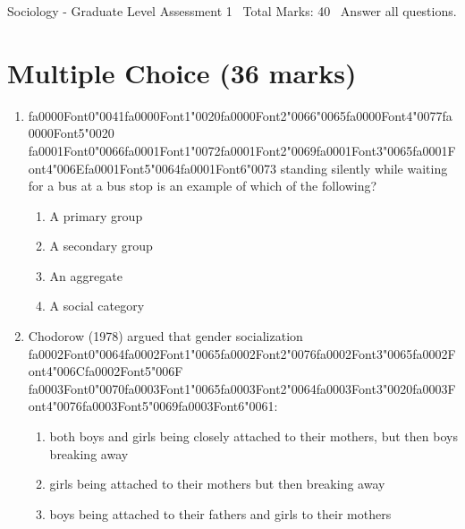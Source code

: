 \documentclass[12pt]{article}
\begin{document}
\begin{center}
Sociology - Graduate Level Assessment 1 \
Total Marks: 40 \
Answer all questions.
\end{center}

\section*{Multiple Choice (36 marks)}
\begin{enumerate}[label=\arabic*.]
\item {\csname fa0000Font0\endcsname\char"0041}{\csname fa0000Font1\endcsname\char"0020}{\csname fa0000Font2\endcsname\char"0066}{\char"0065}{\csname fa0000Font4\endcsname\char"0077}{\csname fa0000Font5\endcsname\char"0020} {\csname fa0001Font0\endcsname\char"0066}{\csname fa0001Font1\endcsname\char"0072}{\csname fa0001Font2\endcsname\char"0069}{\csname fa0001Font3\endcsname\char"0065}{\csname fa0001Font4\endcsname\char"006E}{\csname fa0001Font5\endcsname\char"0064}{\csname fa0001Font6\endcsname\char"0073} standing silently while waiting for a bus at a bus stop is an example of which of the following?
\begin{enumerate}[label=(\alph*)]
    \item A primary group
    \item A secondary group
    \item An aggregate
    \item A social category
\end{enumerate}
\item Chodorow (1978) argued that gender socialization {\csname fa0002Font0\endcsname\char"0064}{\csname fa0002Font1\endcsname\char"0065}{\csname fa0002Font2\endcsname\char"0076}{\csname fa0002Font3\endcsname\char"0065}{\csname fa0002Font4\endcsname\char"006C}{\csname fa0002Font5\endcsname\char"006F} {\csname fa0003Font0\endcsname\char"0070}{\csname fa0003Font1\endcsname\char"0065}{\csname fa0003Font2\endcsname\char"0064}{\csname fa0003Font3\endcsname\char"0020}{\csname fa0003Font4\endcsname\char"0076}{\csname fa0003Font5\endcsname\char"0069}{\csname fa0003Font6\endcsname\char"0061}:
\begin{enumerate}[label=(\alph*)]
    \item both boys and girls being closely attached to their mothers, but then boys breaking away
    \item girls being attached to their mothers but then breaking away
    \item boys being attached to their fathers and girls to their mothers

\end{enumerate}
\end{enumerate}
\end{document}
